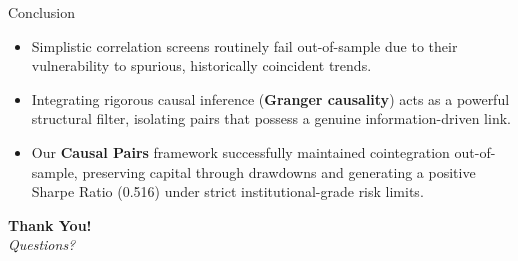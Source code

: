\documentclass[11pt,aspectratio=169]{beamer}
\begin{document}
\begin{frame}{Conclusion}
    \begin{itemize}
        \item Simplistic correlation screens routinely fail out-of-sample due to their vulnerability to spurious, historically coincident trends.
        \vspace{0.2cm}
        \item Integrating rigorous causal inference (\textbf{Granger causality}) acts as a powerful structural filter, isolating pairs that possess a genuine information-driven link.
        \vspace{0.2cm}
        \item Our \textbf{Causal Pairs} framework successfully maintained cointegration out-of-sample, preserving capital through drawdowns and generating a positive Sharpe Ratio (0.516) under strict institutional-grade risk limits.
    \end{itemize}
\end{frame}

\begin{frame}[plain, c]
    \begin{center}
        \Huge \textbf{Thank You!} \\
        \vspace{1cm}
        \large \textit{Questions?}
    \end{center}
\end{frame}
\end{document}
